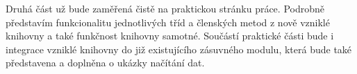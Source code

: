 Druhá část už bude zaměřená čistě na praktickou stránku
práce. Podrobně představím funkcionalitu jednotlivých tříd a členských
metod z nově vzniklé knihovny a také funkčnost knihovny
samotné. Součástí praktické části bude i integrace vzniklé knihovny do
již existujícího zásuvného modulu, která bude také představena a
doplněna o ukázky načítání dat.


